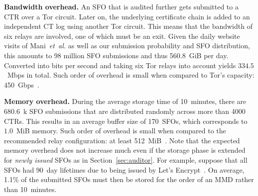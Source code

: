 \textbf{Bandwidth overhead.}  An SFO that is audited further gets submitted to
a CTR over a Tor circuit.  Later on, the underlying certificate chain is added
to an independent CT log using another Tor circuit.  This means that the
bandwidth of six relays are involved, one of which must be an exit.  Given the
daily website visits of Mani~\emph{et~al.} as well as our submission probability
and SFO distribution, this amounts to 98 million SFO submissions and thus
560.8~GiB per day.  Converted into bits per second and taking six Tor relays
into account yields $334.5$~Mbps in total.  Such order of overhead is small when
compared to Tor's capacity: 450~Gbps~\cite{tor-bandwidth}.

\textbf{Memory overhead.}
During the average storage time of 10~minutes, there are 680.6~k SFO submissions
that are distributed randomly across more than 4000 CTRs.  This results in an
average buffer size of 170~SFOs, which corresponds to $1.0$~MiB memory.  Such
order of overhead is small when compared to the recommended relay configuration:
	at least 512~MiB~\cite{relay-config}.
Note that the expected memory overhead does not increase much even if the
storage phase is extended for \emph{newly issued} SFOs as in
Section~\ref{sec:auditor}.  For example, suppose that all SFOs had 90~day
lifetimes due to being issued by Let's Encrypt~\cite{le}.  On average, 1.1\% of
the submitted SFOs must then be stored for the order of an MMD rather than
10~minutes.

